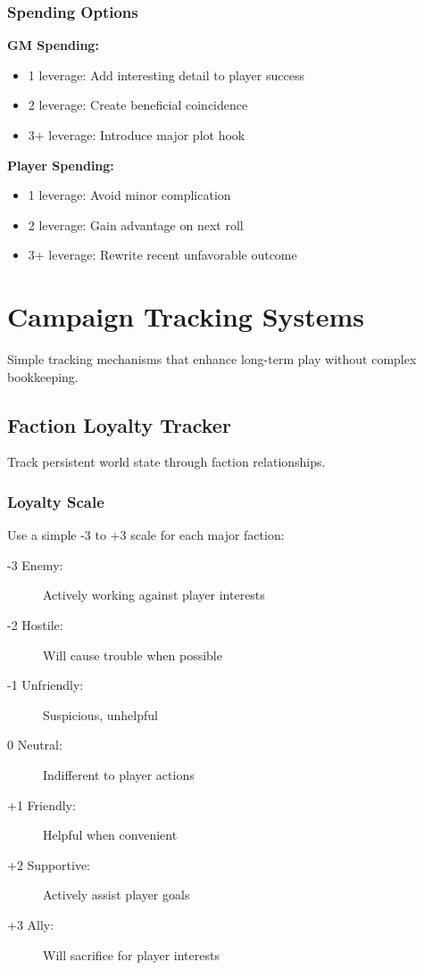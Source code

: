 \begin{description}
\subsubsection{Spending Options}

\textbf{GM Spending:}
\begin{itemize}
\item 1 leverage: Add interesting detail to player success
\item 2 leverage: Create beneficial coincidence
\item 3+ leverage: Introduce major plot hook
\end{itemize}

\textbf{Player Spending:}
\begin{itemize}
\item 1 leverage: Avoid minor complication
\item 2 leverage: Gain advantage on next roll
\item 3+ leverage: Rewrite recent unfavorable outcome
\end{itemize}

\section{Campaign Tracking Systems}

Simple tracking mechanisms that enhance long-term play without complex bookkeeping.

\subsection{Faction Loyalty Tracker}

Track persistent world state through faction relationships.

\subsubsection{Loyalty Scale}

Use a simple -3 to +3 scale for each major faction:
\begin{description}
\item[-3 Enemy:] Actively working against player interests
\item[-2 Hostile:] Will cause trouble when possible
\item[-1 Unfriendly:] Suspicious, unhelpful
\item[0 Neutral:] Indifferent to player actions
\item[+1 Friendly:] Helpful when convenient
\item[+2 Supportive:] Actively assist player goals
\item[+3 Ally:] Will sacrifice for player interests
\end{description}


\end{description}
